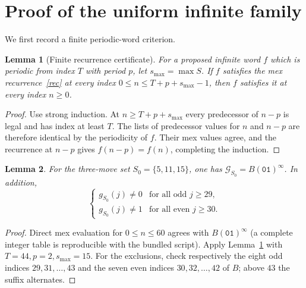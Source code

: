 \documentclass[10pt,a4paper]{article}
\newtheorem{lemma}{Lemma}
\newcommand{\SG}{\mathcal{G}}
\newcommand{\word}[1]{\mathtt{#1}}
\newcommand{\tail}{(\word{01})^{\infty}}
\begin{document}
\section{Proof of the uniform infinite family}
We first record a finite periodic-word criterion.
\begin{lemma}[Finite recurrence certificate]\label{finite}
For a proposed infinite word $f$ which is periodic from index $T$ with period $p$, let $s_{\max}=\max S$. If $f$ satisfies the mex recurrence~\eqref{rec} at every index $0\le n\le T+p+s_{\max}-1$, then $f$ satisfies it at every index $n\ge0$.
\end{lemma}
\begin{proof}
Use strong induction. At $n\ge T+p+s_{\max}$ every predecessor of $n-p$ is legal and has index at least $T$. The lists of predecessor values for $n$ and $n-p$ are therefore identical by the periodicity of $f$. Their mex values agree, and the recurrence at $n-p$ gives $f(n-p)=f(n)$, completing the induction.
\end{proof}
\begin{lemma}\label{base}
For the three-move set $S_0=\{5,11,15\}$, one has
$\SG_{S_0}=B\tail$. In addition,
\begin{equation}\label{base-invariants}
\begin{cases}
g_{S_0}(j)\ne0&\text{for all odd }j\ge29,\\
g_{S_0}(j)\ne1&\text{for all even }j\ge30.
\end{cases}
\end{equation}
\end{lemma}
\begin{proof}
Direct mex evaluation for $0\le n\le60$ agrees with $B\tail$ (a complete integer table is reproducible with the bundled script). Apply Lemma~\ref{finite} with $T=44,p=2,s_{\max}=15$. For the exclusions, check respectively the eight odd indices $29,31,\ldots,43$ and the seven even indices $30,32,\ldots,42$ of $B$; above $43$ the suffix alternates.
\end{proof}
\end{document}
